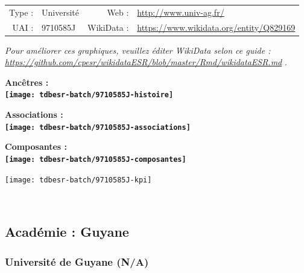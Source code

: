 \documentclass[12pt,french,]{article}
\begin{document}
\begin{tabular*}{\textwidth}{rp{5cm}rl}  
\hline  
Type : & Université & Web : &\href{http://www.univ-ag.fr/}{http://www.univ-ag.fr/} \\  
UAI : & 9710585J & WikiData : & \href{https://www.wikidata.org/entity/Q829169}{https://www.wikidata.org/entity/Q829169} \\  
\hline  
\end{tabular*}

\textit{\scriptsize Pour améliorer ces graphiques, veuillez éditer WikiData selon ce guide :  \href{https://github.com/cpesr/wikidataESR/blob/master/Rmd/wikidataESR.md}{https://github.com/cpesr/wikidataESR/blob/master/Rmd/wikidataESR.md}}
.

\vspace{1cm}  
\begin{minipage}[b]{0.50\textwidth}\begin{center} \bf Ancêtres : \\  
\texttt{[image: tdbesr-batch/9710585J-histoire]} \end{center}\end{minipage}\begin{minipage}[b]{0.50\textwidth}\begin{center} \bf Associations : \\  
\texttt{[image: tdbesr-batch/9710585J-associations]} \end{center}\end{minipage}

\hrulefill

\begin{center} \bf Composantes : \\  
\texttt{[image: tdbesr-batch/9710585J-composantes]} \end{center}

\begin{center}\texttt{[image: tdbesr-batch/9710585J-kpi]} \end{center}\checkoddpage

\ifoddpage \fi ~\newpage  

\hypertarget{acaduxe9mie-guyane}{%
\subsection{Académie : Guyane}\label{acaduxe9mie-guyane}}

\hypertarget{universituxe9-de-guyane-na}{%
\subsubsection{Université de Guyane
(N/A)}\label{universituxe9-de-guyane-na}}
\end{document}
